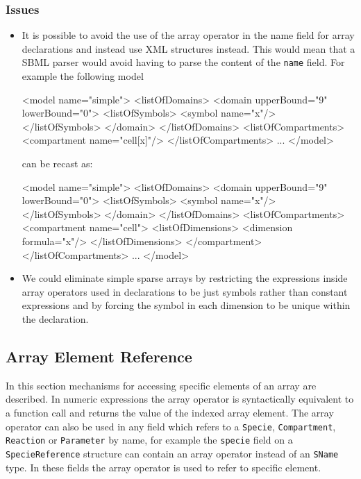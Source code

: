\documentclass{cekarticle}
\begin{document}
\subsubsection{Issues}
\begin{itemize}
\item
It is possible to avoid the use of the array operator in the name
field for array declarations and instead use XML structures
instead.  This would mean that a SBML parser would avoid having
to parse the content of the \texttt{name} field.  For example the
following model
\begin{example}
<model name="simple">
    <listOfDomains>
        <domain upperBound="9" lowerBound="0">
            <listOfSymbols>
                <symbol name="x"/>
            </listOfSymbols>
        </domain>
    </listOfDomains>
    <listOfCompartments>
        <compartment name="cell[x]"/>
    </listOfCompartments>
    ...
</model>
\end{example}
can be recast as:
\begin{example}
<model name="simple">
    <listOfDomains>
        <domain upperBound="9" lowerBound="0">
            <listOfSymbols>
                <symbol name="x"/>
            </listOfSymbols>
        </domain>
    </listOfDomains>
    <listOfCompartments>
        <compartment name="cell">
            <listOfDimensions>
                <dimension formula="x"/>
            </listOfDimensions>
        </compartment>
    </listOfCompartments>
    ...
</model>
\end{example}

\item
We could eliminate simple sparse arrays by restricting the
expressions inside array operators used in declarations to be
just symbols rather than constant expressions and by forcing the
symbol in each dimension to be unique within the declaration.
\end{itemize}

\subsection{Array Element Reference}
In this section mechanisms for accessing specific elements of an
array are described. In numeric expressions the array operator is
syntactically equivalent to a function call and returns the value
of the indexed array element. The array operator can also be used
in any field which refers to a \texttt{Specie},
\texttt{Compartment}, \texttt{Reaction} or \texttt{Parameter} by
name, for example the \texttt{specie} field on a
\texttt{SpecieReference} structure can contain an array operator
instead of an \texttt{SName} type.  In these fields the array
operator is used to refer to specific element.
\end{document}
